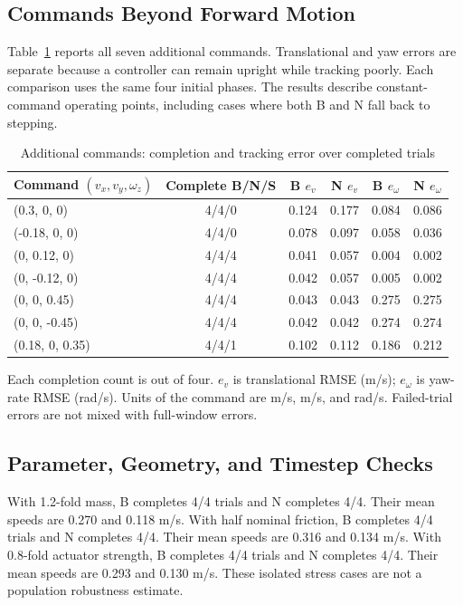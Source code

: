 \subsection{Commands Beyond Forward Motion}
Table~\ref{tab:domain} reports all seven additional commands. Translational and yaw errors are separate because a controller can remain upright while tracking poorly. Each comparison uses the same four initial phases. The results describe constant-command operating points, including cases where both B and N fall back to stepping.
\begin{table}[t]\centering\small
\caption{Additional commands: completion and tracking error over completed trials}
\label{tab:domain}\begin{tabular}{lccccc}\toprule
Command $(v_x,v_y,\omega_z)$ & Complete B/N/S & B $e_v$ & N $e_v$ & B $e_\omega$ & N $e_\omega$\\\midrule
(0.3, 0, 0) & 4/4/0 & 0.124 & 0.177 & 0.084 & 0.086\\
(-0.18, 0, 0) & 4/4/0 & 0.078 & 0.097 & 0.058 & 0.036\\
(0, 0.12, 0) & 4/4/4 & 0.041 & 0.057 & 0.004 & 0.002\\
(0, -0.12, 0) & 4/4/4 & 0.042 & 0.057 & 0.005 & 0.002\\
(0, 0, 0.45) & 4/4/4 & 0.043 & 0.043 & 0.275 & 0.275\\
(0, 0, -0.45) & 4/4/4 & 0.042 & 0.042 & 0.274 & 0.274\\
(0.18, 0, 0.35) & 4/4/1 & 0.102 & 0.112 & 0.186 & 0.212\\
\bottomrule\end{tabular}
\par\vspace{5pt}\noindent\parbox{.96\textwidth}{\footnotesize Each completion count is out of four. $e_v$ is translational RMSE (m/s); $e_\omega$ is yaw-rate RMSE (rad/s). Units of the command are m/s, m/s, and rad/s. Failed-trial errors are not mixed with full-window errors.}
\end{table}

\subsection{Parameter, Geometry, and Timestep Checks}
With 1.2-fold mass, B completes 4/4 trials and N completes 4/4. Their mean speeds are 0.270 and 0.118 m/s. With half nominal friction, B completes 4/4 trials and N completes 4/4. Their mean speeds are 0.316 and 0.134 m/s. With 0.8-fold actuator strength, B completes 4/4 trials and N completes 4/4. Their mean speeds are 0.293 and 0.130 m/s. These isolated stress cases are not a population robustness estimate.

